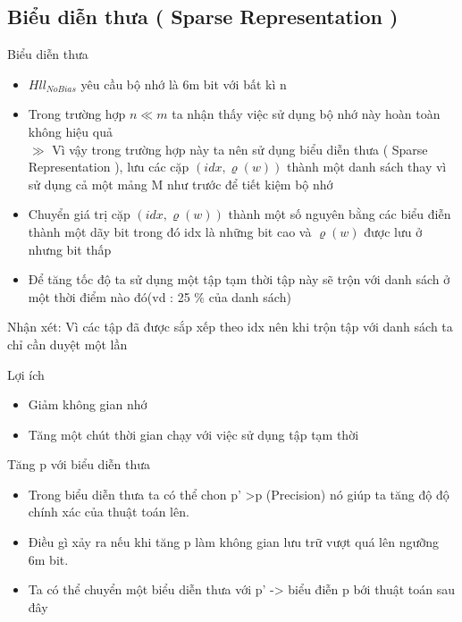 \documentclass{beamer}
\newcommand{\bi}{\begin{itemize}}
\newcommand{\ei}{\end{itemize}}
\begin{document}
\subsection{Biểu diễn thưa ( Sparse Representation )}
\begin{frame}{Biểu diễn thưa}
\bi
\item $Hll_{NoBias} $ yêu cầu bộ nhớ là 6m bit với bất kì n  \\
\item Trong trường hợp $n\ll m $ ta nhận thấy việc sử dụng bộ nhớ này hoàn toàn không hiệu quả \\
$ \gg$ Vì vậy trong trường hợp này ta nên sử dụng biểu diễn thưa ( Sparse Representation ), lưu các cặp $(idx,\varrho(w)) $ thành một danh sách thay vì sử dụng cả một mảng M như trước để tiết kiệm bộ nhớ\\
\item Chuyển giá trị cặp $(idx,\varrho(w)) $ thành một số nguyên bằng các biểu điễn thành một dãy bit trong đó idx là những bit cao và $\varrho(w) $ được lưu ở nhưng bit thấp\\
\ei
\end{frame}
\begin{frame}{}
\bi

\item Để tăng tốc độ ta sử dụng một tập tạm thời tập này sẽ trộn với danh sách ở một thời điểm nào đó(vd : 25 $\%$ của danh sách) \\


\ei
{\color{hilight} Nhận xét:} Vì các tập đã được sắp xếp theo idx nên khi trộn tập với danh sách ta chỉ cần duyệt một lần
\end{frame}
\begin{frame}{Lợi ích }
\begin{itemize}
\item Giảm không gian nhớ
\item Tăng một chút thời gian chạy với việc sử dụng tập tạm thời
\end{itemize}
\end{frame}
\begin{frame}{Tăng p với biểu diễn thưa} 
\bi
\item Trong biểu diễn thưa ta có thể chon p' >p (Precision) nó giúp ta tăng độ  độ chính xác của thuật toán lên.\\

\item Điều gì xảy ra nếu khi tăng p làm không gian lưu trữ vượt quá lên ngưỡng 6m bit.\\
\item Ta có thể chuyển một biểu diễn thưa với p' -> biểu điễn p bới thuật toán sau đây
\ei 
\end{frame}
\end{document}
